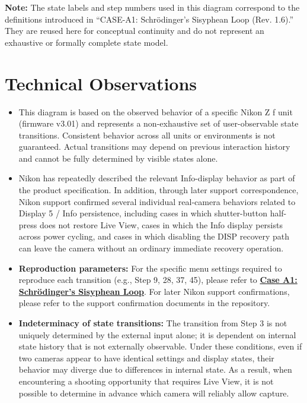 \documentclass[a4paper,10pt]{article}
\begin{document}
\vspace{-4em}
\scriptsize

\noindent
\textbf{Note:}
The state labels and step numbers used in this diagram
correspond to the definitions introduced in
``CASE-A1: Schrödinger's Sisyphean Loop (Rev. 1.6).''
They are reused here for conceptual continuity and do not
represent an exhaustive or formally complete state model.

\section*{Technical Observations}


\begin{itemize}
\item This diagram is based on the observed behavior of a specific Nikon Z f
unit (firmware v3.01) and represents a non-exhaustive set of
user-observable state transitions. Consistent behavior across all units or
environments is not guaranteed. Actual transitions may depend on previous
interaction history and cannot be fully determined by visible states alone.

\item Nikon has repeatedly described the relevant Info-display behavior as
part of the product specification. In addition, through later support
correspondence, Nikon support confirmed several individual real-camera
behaviors related to Display 5 / Info persistence, including cases in which
shutter-button half-press does not restore Live View, cases in which the
Info display persists across power cycling, and cases in which disabling
the DISP recovery path can leave the camera without an ordinary immediate
recovery operation.

\item \textbf{Reproduction parameters:}
For the specific menu settings required to reproduce each transition
(e.g., Step 9, 28, 37, 45), please refer to
\href{https://github.com/acta-lgtm/nikon-z-display5-persistence-case-zf/blob/main/docs/DA/Case_A1_Schrodinger.md}
{\textbf{Case A1: Schrödinger's Sisyphean Loop}}.
For later Nikon support confirmations, please refer to the support
confirmation documents in the repository.

\item \textbf{Indeterminacy of state transitions:}
The transition from Step 3 is not uniquely determined by the external input
alone; it is dependent on internal state history that is not externally
observable. Under these conditions, even if two cameras appear to have
identical settings and display states, their behavior may diverge due to
differences in internal state. As a result, when encountering a shooting
opportunity that requires Live View, it is not possible to determine in
advance which camera will reliably allow capture.


\end{itemize}
\end{document}
